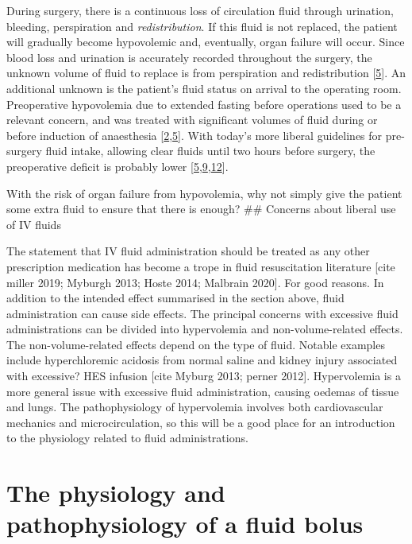 \documentclass[a4paper, nobind]{templates/ociamthesis}
\begin{document}
During surgery, there is a continuous loss of circulation fluid through urination, bleeding, perspiration and \emph{redistribution}. If this fluid is not replaced, the patient will gradually become hypovolemic and, eventually, organ failure will occur. Since blood loss and urination is accurately recorded throughout the surgery, the unknown volume of fluid to replace is from perspiration and redistribution {[}\protect\hyperlink{ref-jacobThirdSpaceFact2009}{5}{]}. An additional unknown is the patient's fluid status on arrival to the operating room. Preoperative hypovolemia due to extended fasting before operations used to be a relevant concern, and was treated with significant volumes of fluid during or before induction of anaesthesia {[}\protect\hyperlink{ref-coeCrystalloidPreloadingUseful1990}{2},\protect\hyperlink{ref-jacobThirdSpaceFact2009}{5}{]}. With today's more liberal guidelines for pre-surgery fluid intake, allowing clear fluids until two hours before surgery, the preoperative deficit is probably lower {[}\protect\hyperlink{ref-jacobThirdSpaceFact2009}{5},\protect\hyperlink{ref-millerPerioperativeFluidTherapy2019}{9},\protect\hyperlink{ref-smithPerioperativeFastingAdults2011}{12}{]}.

With the risk of organ failure from hypovolemia, why not simply give the patient some extra fluid to ensure that there is enough?
\#\# Concerns about liberal use of IV fluids

The statement that IV fluid administration should be treated as any other prescription medication has become a trope in fluid resuscitation literature {[}cite miller 2019; Myburgh 2013; Hoste 2014; Malbrain 2020{]}. For good reasons. In addition to the intended effect summarised in the section above, fluid administration can cause side effects. The principal concerns with excessive fluid administrations can be divided into hypervolemia and non-volume-related effects. The non-volume-related effects depend on the type of fluid. Notable examples include hyperchloremic acidosis from normal saline and kidney injury associated with excessive? HES infusion {[}cite Myburg 2013; perner 2012{]}. Hypervolemia is a more general issue with excessive fluid administration, causing oedemas of tissue and lungs. The pathophysiology of hypervolemia involves both cardiovascular mechanics and microcirculation, so this will be a good place for an introduction to the physiology related to fluid administrations.

\hypertarget{fluid-bolus-physiology}{%
\section{The physiology and pathophysiology of a fluid bolus}\label{fluid-bolus-physiology}}
\end{document}
